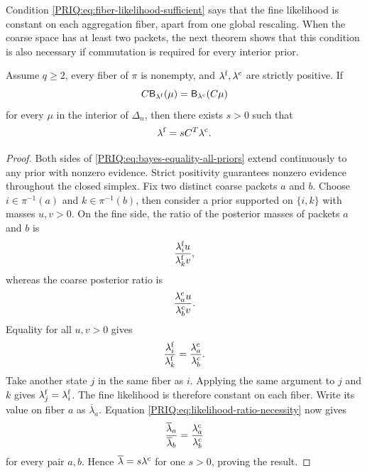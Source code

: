 Condition \eqref{PRIQ:eq:fiber-likelihood-sufficient} says that the fine likelihood is constant on each aggregation fiber, apart from one global rescaling.  When the coarse space has at least two packets, the next theorem shows that this condition is also necessary if commutation is required for every interior prior.

\begin{PRIQtheorem}\label{PRIQ:thm:bayes-necessity}
Assume $q\geq2$, every fiber of $\pi$ is nonempty, and $\lambda^{\mathrm f},\lambda^{\mathrm c}$ are strictly positive.  If
\begin{equation}\label{PRIQ:eq:bayes-equality-all-priors}
  C\mathsf B_{\lambda^{\mathrm f}}(\mu)
  =
  \mathsf B_{\lambda^{\mathrm c}}(C\mu)
\end{equation}
for every $\mu$ in the interior of $\Delta_n$, then there exists $s>0$ such that
\[
  \lambda^{\mathrm f}=sC^T\lambda^{\mathrm c}.
\]
\end{PRIQtheorem}

\begin{proof}
Both sides of \eqref{PRIQ:eq:bayes-equality-all-priors} extend continuously to any prior with nonzero evidence.  Strict positivity guarantees nonzero evidence throughout the closed simplex.  Fix two distinct coarse packets $a$ and $b$.  Choose $i\in\pi^{-1}(a)$ and $k\in\pi^{-1}(b)$, then consider a prior supported on $\{i,k\}$ with masses $u,v>0$.  On the fine side, the ratio of the posterior masses of packets $a$ and $b$ is
\[
  \frac{\lambda_i^{\mathrm f}u}{\lambda_k^{\mathrm f}v},
\]
whereas the coarse posterior ratio is
\[
  \frac{\lambda_a^{\mathrm c}u}{\lambda_b^{\mathrm c}v}.
\]
Equality for all $u,v>0$ gives
\begin{equation}\label{PRIQ:eq:likelihood-ratio-necessity}
  \frac{\lambda_i^{\mathrm f}}{\lambda_k^{\mathrm f}}
  =
  \frac{\lambda_a^{\mathrm c}}{\lambda_b^{\mathrm c}}.
\end{equation}
Take another state $j$ in the same fiber as $i$.  Applying the same argument to $j$ and $k$ gives $\lambda_j^{\mathrm f}=\lambda_i^{\mathrm f}$.  The fine likelihood is therefore constant on each fiber.  Write its value on fiber $a$ as $\overline\lambda_a$.  Equation \eqref{PRIQ:eq:likelihood-ratio-necessity} now gives
\[
  \frac{\overline\lambda_a}{\overline\lambda_b}
  =
  \frac{\lambda_a^{\mathrm c}}{\lambda_b^{\mathrm c}}
\]
for every pair $a,b$.  Hence $\overline\lambda=s\lambda^{\mathrm c}$ for one $s>0$, proving the result.
\end{proof}

